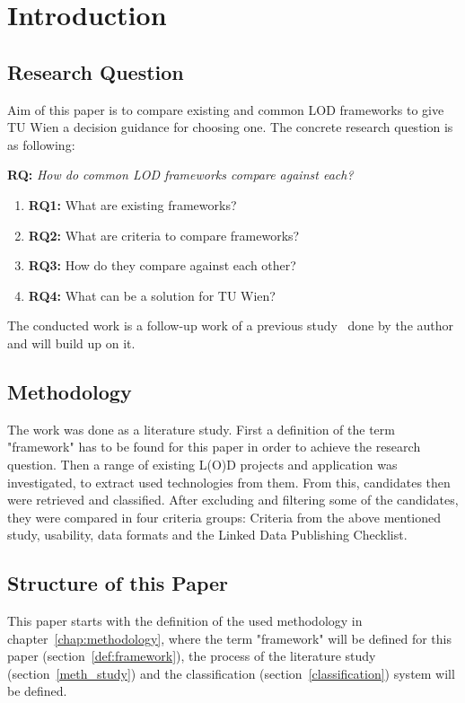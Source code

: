 \chapter{Introduction}

\section{Research Question}

Aim of this paper is to compare existing and common LOD frameworks to give TU Wien a decision guidance for choosing one. The concrete research question is as following:

\textbf{RQ:} \textit{How do common LOD frameworks compare against each?}
\begin{enumerate}
\item \textbf{RQ1:} What are existing frameworks?
\item \textbf{RQ2:} What are criteria to compare frameworks?
\item \textbf{RQ3:} How do they compare against each other?
\item \textbf{RQ4:} What can be a solution for TU Wien?
\end{enumerate}

The conducted work is a follow-up work of a previous study~\cite{baronyai_publishing_2016} done by the author and will build up on it.

\section{Methodology}

The work was done as a literature study. First a definition of the term "framework" has to be found for this paper in order to achieve the research question. Then a range of existing L(O)D projects and application was investigated, to extract used technologies from them. From this, candidates then were retrieved and classified. After excluding and filtering some of the candidates, they were compared in four criteria groups: Criteria from the above mentioned study, usability, data formats and the Linked Data Publishing Checklist.

\section{Structure of this Paper}
This paper starts with the definition of the used methodology in chapter~\ref{chap:methodology}, where the term "framework" will be defined for this paper (section~\ref{def:framework}), the process of the literature study (section~\ref{meth_study}) and the classification (section~\ref{classification}) system will be defined.

